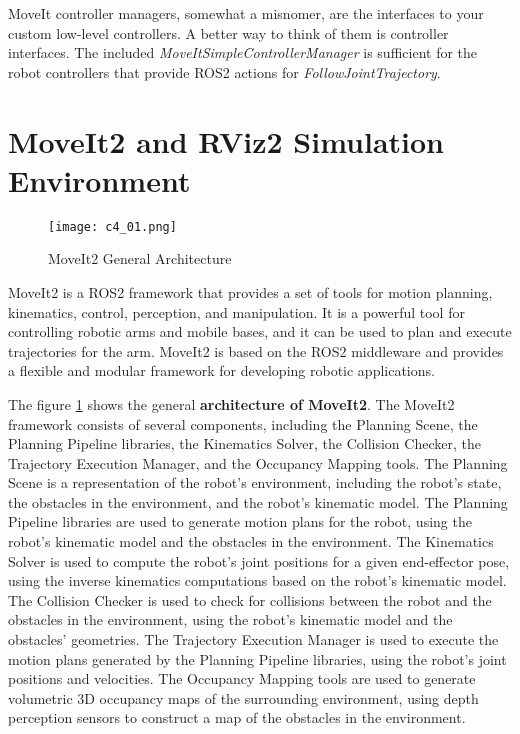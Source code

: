 MoveIt controller managers, somewhat a misnomer, are the interfaces to your custom low-level controllers. 
A better way to think of them is controller interfaces. The included \textit{MoveItSimpleControllerManager} is sufficient
for the robot controllers that provide ROS2 actions for \textit{FollowJointTrajectory}.

\section{MoveIt2 and RViz2 Simulation Environment}

\begin{figure}[t]
    \centering
    \texttt{[image: c4\_01.png]}
    \caption{MoveIt2 General Architecture}
    \label{fig:moveit2}
\end{figure}

MoveIt2 is a ROS2 framework that provides a set of tools for motion planning, kinematics, control, perception, and
manipulation. It is a powerful tool for controlling robotic arms and mobile bases, and it can be used to plan and
execute trajectories for the arm. MoveIt2 is based on the ROS2 middleware and provides a flexible and modular
framework for developing robotic applications.

The figure \ref{fig:moveit2} shows the general \textbf{architecture of MoveIt2}. The MoveIt2 framework consists of several
components, including the Planning Scene, the Planning Pipeline libraries, the Kinematics Solver, the Collision
Checker, the Trajectory Execution Manager, and the Occupancy Mapping tools.
The Planning Scene is a representation of the robot's environment, including the robot's state, the obstacles in the
environment, and the robot's kinematic model. The Planning Pipeline libraries are used to generate motion plans
for the robot, using the robot's kinematic model and the obstacles in the environment. The Kinematics Solver is
used to compute the robot's joint positions for a given end-effector pose, using the inverse kinematics
computations based on the robot's kinematic model. The Collision Checker is used to check for collisions between
the robot and the obstacles in the environment, using the robot's kinematic model and the obstacles' geometries.
The Trajectory Execution Manager is used to execute the motion plans generated by the Planning Pipeline libraries,
using the robot's joint positions and velocities. The Occupancy Mapping tools are used to generate volumetric 3D 
occupancy maps of the surrounding environment, using depth perception sensors to construct a map
of the obstacles in the environment. 

